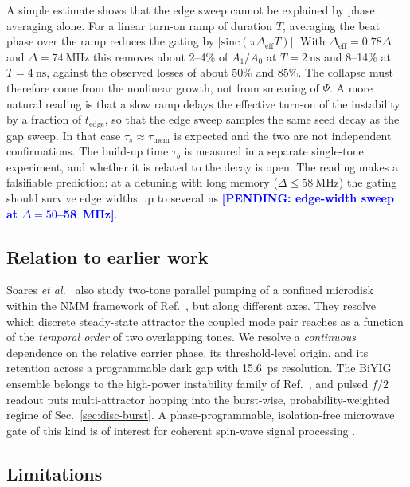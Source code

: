 \documentclass[aps,prb,reprint,superscriptaddress,floatfix]{revtex4-2}
\newcommand{\pend}[1]{\textcolor{blue}{\textbf{[PENDING: #1]}}}
\newcommand{\pend}[1]{}
\newcommand{\Deff}{\Delta_{\mathrm{eff}}}
\begin{document}
A simple estimate shows that the edge sweep cannot be explained by phase averaging alone. For a linear turn-on ramp of duration $T$, averaging the beat phase over the ramp reduces the gating by $|\mathrm{sinc}(\pi\Deff T)|$. With $\Deff=0.78\Delta$ and $\Delta=\SI{74}{\mega\hertz}$ this removes about 2--4\% of $A_1/A_0$ at $T=\SI{2}{\nano\second}$ and 8--14\% at $T=\SI{4}{\nano\second}$, against the observed losses of about 50\% and 85\%. The collapse must therefore come from the nonlinear growth, not from smearing of $\Psi$. A more natural reading is that a slow ramp delays the effective turn-on of the instability by a fraction of $t_{\mathrm{edge}}$, so that the edge sweep samples the same seed decay as the gap sweep. In that case $\tau_s\approx\tau_{\mathrm{mem}}$ is expected and the two are not independent confirmations. The build-up time $\tau_b$ is measured in a separate single-tone experiment, and whether it is related to the decay is open. The reading makes a falsifiable prediction: at a detuning with long memory ($\Delta\le\SI{58}{\mega\hertz}$) the gating should survive edge widths up to several ns \pend{edge-width sweep at $\Delta=50$--\SI{58}{\mega\hertz}}.

\subsection{Relation to earlier work}\label{sec:disc-soares}

Soares \textit{et al.}\ \cite{soares26} also study two-tone parallel pumping of a confined microdisk within the NMM framework of Ref.~\cite{daquino26}, but along different axes. They resolve which discrete steady-state attractor the coupled mode pair reaches as a function of the \emph{temporal order} of two overlapping tones. We resolve a \emph{continuous} dependence on the relative carrier phase, its threshold-level origin, and its retention across a programmable dark gap with \SI{15.6}{\pico\second} resolution. The BiYIG ensemble belongs to the high-power instability family of Ref.~\cite{yemeli25}, and pulsed $f/2$ readout puts multi-attractor hopping into the burst-wise, probability-weighted regime of Sec.~\ref{sec:disc-burst}. A phase-programmable, isolation-free microwave gate of this kind is of interest for coherent spin-wave signal processing \cite{korber23,papp21}.

\subsection{Limitations}\label{sec:disc-limits}
\end{document}
